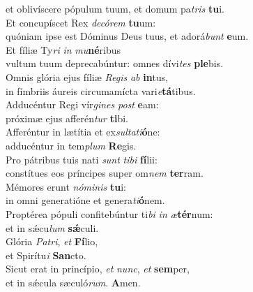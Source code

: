 \evenverse et oblivíscere pópulum tuum, et domum pa\textit{tris} \textbf{tu}i.\\
\oddverse Et concupíscet Rex \textit{de}\textit{có}\textit{rem} \textbf{tu}um:~\*\\
\oddverse quóniam ipse est Dóminus Deus tuus, et adorá\textit{bunt} \textbf{e}um.\\
\evenverse Et fíliæ Ty\textit{ri} \textit{in} \textit{mu}\textbf{né}ribus~\*\\
\evenverse vultum tuum deprecabúntur: omnes dívi\textit{tes} \textbf{ple}bis.\\
\oddverse Omnis glória ejus fíliæ \textit{Re}\textit{gis} \textit{ab} \textbf{in}tus,~\*\\
\oddverse in fímbriis áureis circumamícta vari\textit{e}\textbf{tá}tibus.\\
\evenverse Adducéntur Regi vír\textit{gi}\textit{nes} \textit{post} \textbf{e}am:~\*\\
\evenverse próximæ ejus afferén\textit{tur} \textbf{ti}bi.\\
\oddverse Afferéntur in lætítia et ex\textit{sul}\textit{ta}\textit{ti}\textbf{ó}ne:~\*\\
\oddverse adducéntur in tem\textit{plum} \textbf{Re}gis.\\
\evenverse Pro pátribus tuis nati \textit{sunt} \textit{ti}\textit{bi} \textbf{fí}lii:~\*\\
\evenverse constítues eos príncipes super om\textit{nem} \textbf{ter}ram.\\
\oddverse Mémores erunt \textit{nó}\textit{mi}\textit{nis} \textbf{tu}i:~\*\\
\oddverse in omni generatióne et genera\textit{ti}\textbf{ó}nem.\\
\evenverse Proptérea pópuli confitebúntur ti\textit{bi} \textit{in} \textit{æ}\textbf{tér}num:~\*\\
\evenverse et in sǽcu\textit{lum} \textbf{sǽ}culi.\\
\oddverse Glória \textit{Pa}\textit{tri}, \textit{et} \textbf{Fí}lio,~\*\\
\oddverse et Spirítu\textit{i} \textbf{San}cto.\\
\evenverse Sicut erat in princípio, \textit{et} \textit{nunc}, \textit{et} \textbf{sem}per,~\*\\
\evenverse et in sǽcula sæculó\textit{rum}. \textbf{A}men.\\
